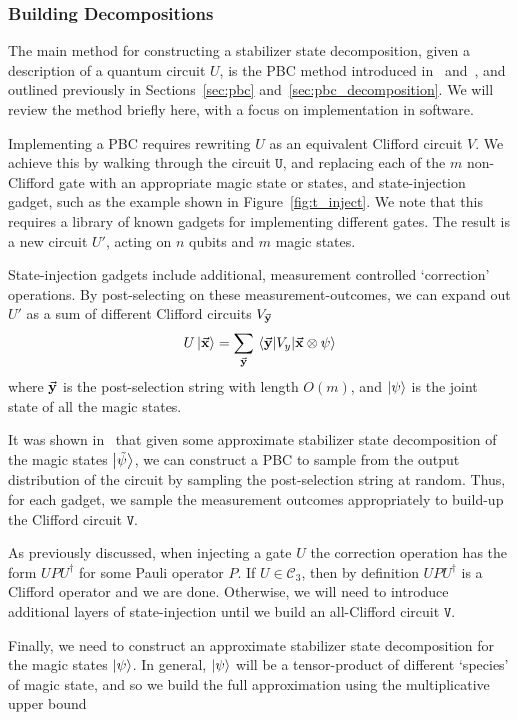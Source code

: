 \subsubsection*{Building Decompositions}
The main method for constructing a stabilizer state decomposition, given a description of a quantum circuit $U$, is the PBC method introduced in~\cite{Bravyi2015} and~\cite{Bravyi2016}, and outlined previously in Sections~\ref{sec:pbc} and~\ref{sec:pbc_decomposition}. We will review the method briefly here, with a focus on implementation in software. \par
Implementing a PBC requires rewriting $U$ as an equivalent Clifford circuit $V$. We achieve this by walking through the circuit $\texttt{U}$, and replacing each of the $m$ non-Clifford gate with an appropriate magic state or states, and state-injection gadget, such as the example shown in Figure~\ref{fig:t_inject}. We note that this requires a library of known gadgets for implementing different gates. The result is a new circuit $U'$, acting on $n$ qubits and $m$ magic states.\par
State-injection gadgets include additional, measurement controlled `correction' operations. By post-selecting on these measurement-outcomes, we can expand out $U'$ as a sum of different Clifford circuits $V_{\va{y}}$
\[U\ket{\va{x}} = \sum_{\va{y}}\matrixel{\va{y}}{V_{y}}{\va{x}\otimes \psi} \]
where $\va{y}$ is the post-selection string with length $O(m)$, and $\ket{\psi}$ is the joint state of all the magic states.\par
It was shown in~\cite{Bravyi2016} that given some approximate stabilizer state decomposition of the magic states $\ket{\tilde{\psi}}$, we can construct a PBC to sample from the output distribution of the circuit by sampling the post-selection string at random. Thus, for each gadget, we sample the measurement outcomes appropriately to build-up the Clifford circuit $\mathtt{V}$.\par
As previously discussed, when injecting a gate $U$ the correction operation has the form $UPU^{\dagger}$ for some Pauli operator $P$. If $U\in\mathcal{C}_{3}$, then by definition $UPU^{\dagger}$ is a Clifford operator and we are done. Otherwise, we will need to introduce additional layers of state-injection until we build an all-Clifford circuit $\mathtt{V}$.\par
Finally, we need to construct an approximate stabilizer state decomposition for the magic states $\ket{\psi}$. In general, $\ket{\psi}$ will be a tensor-product of different `species' of magic state, and so we build the full approximation using the multiplicative upper bound
